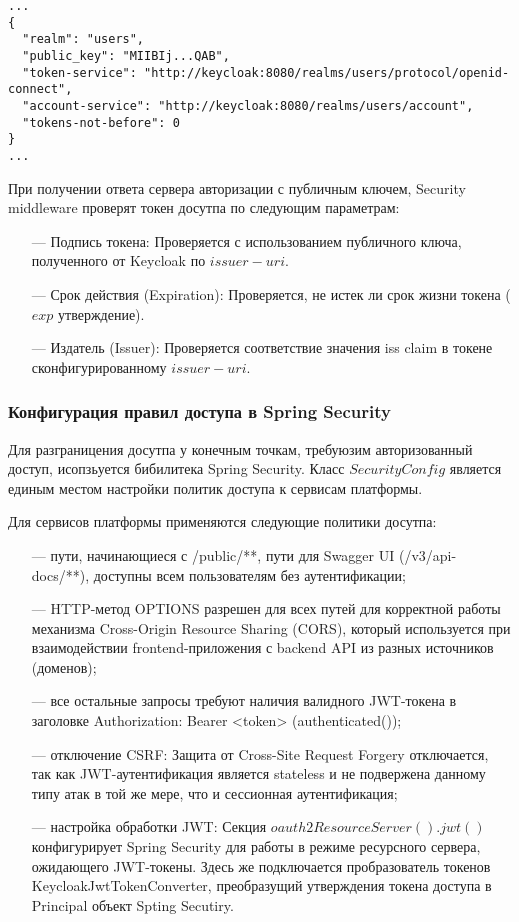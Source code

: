 \begin{lstlisting}[caption={Ответ на запрос публичного ключа}, label=lst:iss_uri_response]
...
{
  "realm": "users",
  "public_key": "MIIBIj...QAB",
  "token-service": "http://keycloak:8080/realms/users/protocol/openid-connect",
  "account-service": "http://keycloak:8080/realms/users/account",
  "tokens-not-before": 0
}
...
\end{lstlisting}

При получении ответа сервера авторизации с публичным ключем, Security middleware проверят токен досутпа по следующим параметрам:

\begin{itemize}
\item[---] Подпись токена: Проверяется с использованием публичного ключа, полученного от Keycloak по $issuer-uri$.
\item[---] Срок действия (Expiration): Проверяется, не истек ли срок жизни токена ($exp$ утверждение).
\item[---] Издатель (Issuer): Проверяется соответствие значения iss claim в токене сконфигурированному $issuer-uri$.
\end{itemize}

\subsubsection{Конфигурация правил доступа в Spring Security}

Для разграницения досутпа у конечным точкам, требуюзим авторизованный доступ, исопзьуется бибилитека Spring Security.
Класс $SecurityConfig$ является единым местом настройки политик доступа к сервисам платформы.

Для сервисов платформы применяются следующие политики досутпа:

\begin{itemize}
  \item[---]пути, начинающиеся с /public/**, пути для Swagger UI (/v3/api-docs/**), доступны всем пользователям без аутентификации;
  \item[---]HTTP-метод OPTIONS разрешен для всех путей для корректной работы механизма Cross-Origin Resource Sharing (CORS)\cite{arai2024method}, который используется при взаимодействии frontend-приложения с backend API из разных источников (доменов);
  \item[---]все остальные запросы требуют наличия валидного JWT-токена в заголовке Authorization: Bearer <token> (authenticated());
  \item[---]отключение CSRF\cite{barth2008robust}: Защита от Cross-Site Request Forgery отключается, так как JWT-аутентификация является stateless и не подвержена данному типу атак в той же мере, что и сессионная аутентификация;
  \item[---]настройка обработки JWT: Секция $oauth2ResourceServer().jwt()$ конфигурирует Spring Security для работы в режиме ресурсного сервера, ожидающего JWT-токены. Здесь же подключается пробразователь токенов KeycloakJwtTokenConverter, преобразущий утверждения токена доступа в Principal объект Spting Secutiry.
\end{itemize}

